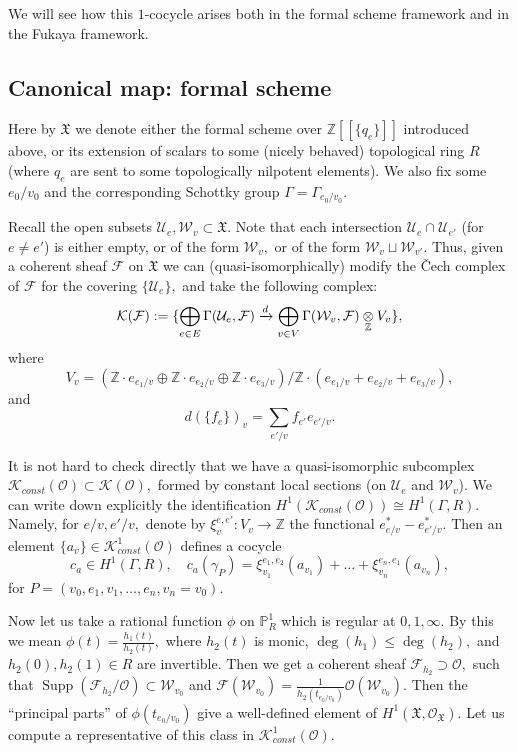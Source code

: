 \documentclass[11pt,leqno]{amsart}
\numberwithin{equation}{section}
\def\Z{\mathbb{Z}}
\def\PP{{\mathbb P}}
\newcommand{\tens}[1]{%
  \mathbin{\mathop{\otimes}\displaylimits_{#1}}%
}
\newcommand{\xto}{\xrightarrow}
\newcommand{\cF}{{\mathcal F}}
\newcommand{\cO}{{\mathcal O}}
\newcommand{\cW}{{\mathcal W}}
\newcommand{\cU}{{\mathcal U}}
\newcommand{\cK}{{\mathcal K}}
\newcommand{\mX}{{\mathfrak X}}
\newcommand{\supp}{\operatorname{Supp}}
\begin{document}
We will see how this $1$-cocycle arises both in the formal scheme framework and in the Fukaya framework.



\subsection{Canonical map: formal scheme} 

Here by $\mX$ we denote either the formal scheme over $\Z[[\{q_{e}\}]]$ introduced above, or its extension of scalars to some (nicely behaved) topological ring $R$ (where $q_{e}$ are sent to some topologically nilpotent elements). We also fix some $e_0/v_0$ and the corresponding Schottky group $\Gamma=\Gamma_{e_0/v_0}.$

Recall the open subsets $\cU_{e},\cW_{v}\subset\mX.$ Note that each intersection $\cU_{e}\cap \cU_{e'}$ (for $e\ne e'$) is either empty, or of the form $\cW_{v},$ or of the form $\cW_{v}\sqcup\cW_{v'}.$ Thus, given a coherent sheaf $\cF$ on $\mX$ we can (quasi-isomorphically) modify the \v Cech complex of $\cF$ for the covering $\{\cU_{e}\},$ and take the following complex: $$\cK(\cF):=\{\bigoplus_{e\in E}\Gamma(\cU_{e},\cF)\xto{d}\bigoplus_{v\in V} \Gamma(\cW_{v},\cF)\tens{\Z}V_{v}\},$$
where $$V_{v}=(\Z\cdot e_{e_1/v}\oplus \Z\cdot e_{e_2/v}\oplus \Z\cdot e_{e_3/v})/\Z\cdot (e_{e_1/v}+e_{e_2/v}+e_{e_3/v}),$$ and
$$d(\{f_{e}\})_{v}=\sum\limits_{e'/v}f_{e'}e_{e'/v}.$$

It is not hard to check directly that we have a quasi-isomorphic subcomplex $\cK_{const}(\cO)\subset \cK(\cO),$ formed by constant local sections (on $\cU_{e}$ and $\cW_{v}$). We can write down explicitly the identification $H^1(\cK_{const}(\cO))\cong H^1(\Gamma,R).$ Namely, for $e/v,e'/v,$ denote by $\xi^{e,e'}_{v}:V_{v}\to\Z$ the functional $e_{e/v}^*-e_{e'/v}^*.$ Then an element $\{a_{v}\}\in \cK^1_{const}(\cO)$ defines a cocycle
\begin{equation}\label{eq:from_Cech_to_group_cohom}c_a\in H^1(\Gamma,R),\quad c_a(\gamma_P)=\xi_{v_1}^{e_1,e_2}(a_{v_1})+\dots+\xi_{v_n}^{e_n,e_1}(a_{v_n}),\end{equation}
for $P=(v_0,e_1,v_1,\dots,e_n,v_n=v_0).$  

Now let us take a rational function $\phi$ on $\PP^1_R$ which is regular at $0,1,\infty.$ By this we mean $\phi(t)=\frac{h_1(t)}{h_2(t)},$ where $h_2(t)$ is monic, $\deg(h_1)\leq\deg(h_2),$ and $h_2(0),h_2(1)\in R$ are invertible. Then we get a coherent sheaf $\cF_{h_2}\supset \cO,$ such that $\supp(\cF_{h_2}/\cO)\subset \cW_{v_0}$ and $\cF(\cW_{v_0})=\frac{1}{h_2(t_{e_0/v_0})}\cO(\cW_{v_0}).$  Then the ``principal parts'' of $\phi(t_{e_0/v_0})$ give a well-defined element of $H^1(\mX,\cO_{\mX}).$ Let us compute a representative of this class in $\cK^1_{const}(\cO).$
\end{document}
